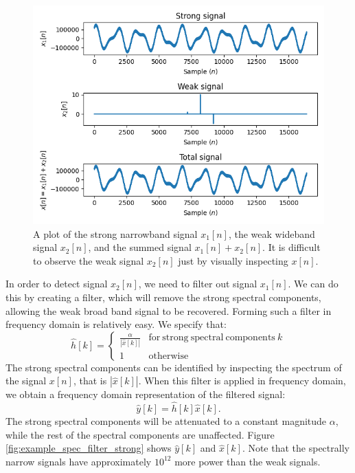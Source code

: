 \begin{figure}
  \begin{center}
    \includegraphics[width=\textwidth]{code/024_fft_filter/filter_signals.png}
  \end{center}
  \caption{A plot of the strong narrowband signal $x_1[n]$, the weak wideband signal $x_2[n]$,
  and the summed signal $x_1[n]+x_2[n]$. It is difficult to observe the weak signal $x_2[n]$ just by visually inspecting $x[n]$.}
  \label{fig:strong_overpowering_signal}
\end{figure}

In order to detect signal $x_2[n]$, we need to filter out signal
$x_1[n]$. We can do this by creating a filter, which will remove the
strong spectral components, allowing the weak broad band signal to be
recovered. Forming such a filter in frequency domain is relatively
easy. We specify that:
\begin{equation}
  \hat{h}[k] = \left\{\begin{array}{cc}
    \frac{\alpha}{|\hat{x}[k]|} & \mathrm{for~strong~spectral~components}~k \\
    1                           & \mathrm{otherwise}
  \end{array}
  \right.
\end{equation}
The strong spectral components can be identified by inspecting the
spectrum of the signal $x[n]$, that is $|\hat{x}[k]|$. When this filter is applied
in frequency domain, we obtain a frequency domain representation of the filtered signal:
\begin{equation}
  \hat{y}[k] = \hat{h}[k]\hat{x}[k].
\end{equation}
The strong spectral components will be attenuated to a constant
magnitude $\alpha$, while the rest of the spectral components are
unaffected. Figure \ref{fig:example_spec_filter_strong} shows
$\hat{y}[k]$ and $\hat{x}[k]$. Note that the spectrally narrow signals
have approximately $10^{12}$ more power than the weak signals.

